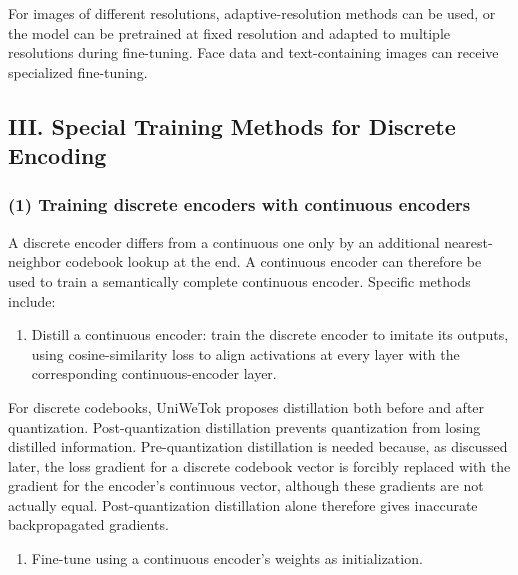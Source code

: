 For images of different resolutions, adaptive-resolution methods can be used, or the model can be pretrained at fixed resolution and adapted to multiple resolutions during fine-tuning. Face data and text-containing images can receive specialized fine-tuning.

\hypertarget{iii.-special-training-methods-for-discrete-encoding}{%
\subsection{III. Special Training Methods for Discrete Encoding}\label{iii.-special-training-methods-for-discrete-encoding}}

\hypertarget{training-discrete-encoders-with-continuous-encoders}{%
\subsubsection{(1) Training discrete encoders with continuous encoders}\label{training-discrete-encoders-with-continuous-encoders}}

A discrete encoder differs from a continuous one only by an additional nearest-neighbor codebook lookup at the end. A continuous encoder can therefore be used to train a semantically complete continuous encoder. Specific methods include:

\begin{enumerate}
\def\labelenumi{\arabic{enumi}.}
\tightlist
\item
  Distill a continuous encoder: train the discrete encoder to imitate its outputs, using cosine-similarity loss to align activations at every layer with the corresponding continuous-encoder layer.
\end{enumerate}

For discrete codebooks, UniWeTok proposes distillation both before and after quantization. Post-quantization distillation prevents quantization from losing distilled information. Pre-quantization distillation is needed because, as discussed later, the loss gradient for a discrete codebook vector is forcibly replaced with the gradient for the encoder's continuous vector, although these gradients are not actually equal. Post-quantization distillation alone therefore gives inaccurate backpropagated gradients.

\begin{enumerate}
\def\labelenumi{\arabic{enumi}.}
\setcounter{enumi}{1}
\tightlist
\item
  Fine-tune using a continuous encoder's weights as initialization.
\end{enumerate}

